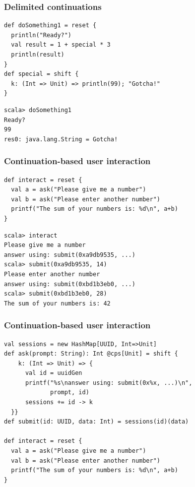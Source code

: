 \documentclass[14pt,t,usepdftitle=false,
xcolornames=x11names,svgnames,dvipsnames]{beamer}
\begin{document}
\begin{frame}[fragile]
  \frametitle{Delimited continuations}
\begin{lstlisting}[style=scala,emph={[2]reset,shift}]
def doSomething1 = reset {
  println("Ready?")
  val result = 1 + special * 3
  println(result)
}
def special = shift {
  k: (Int => Unit) => println(99); "Gotcha!"
}
\end{lstlisting}
\begin{lstlisting}[style=scalarepl]
scala> doSomething1
Ready?
99
res0: java.lang.String = Gotcha!
\end{lstlisting}
\end{frame}

\begin{frame}[fragile]
  \frametitle{Continuation-based user interaction}
\begin{lstlisting}[style=scala,emph={[2]reset,shift}]
def interact = reset {
  val a = ask("Please give me a number")
  val b = ask("Please enter another number")
  printf("The sum of your numbers is: %d\n", a+b)
}
\end{lstlisting}
\begin{lstlisting}[style=scalarepl]
scala> interact
Please give me a number
answer using: submit(0xa9db9535, ...)
scala> submit(0xa9db9535, 14)
Please enter another number
answer using: submit(0xbd1b3eb0, ...)
scala> submit(0xbd1b3eb0, 28)
The sum of your numbers is: 42
\end{lstlisting}
\end{frame}

\begin{frame}[fragile]
  \frametitle{Continuation-based user interaction}
\begin{lstlisting}[style=scala,emph={[2]reset,shift}]
val sessions = new HashMap[UUID, Int=>Unit]
def ask(prompt: String): Int @cps[Unit] = shift {
    k: (Int => Unit) => {
      val id = uuidGen
      printf("%s\nanswer using: submit(0x%x, ...)\n",
             prompt, id)
      sessions += id -> k
  }}
def submit(id: UUID, data: Int) = sessions(id)(data)

def interact = reset {
  val a = ask("Please give me a number")
  val b = ask("Please enter another number")
  printf("The sum of your numbers is: %d\n", a+b)
}
\end{lstlisting}
\end{frame}
\end{document}
